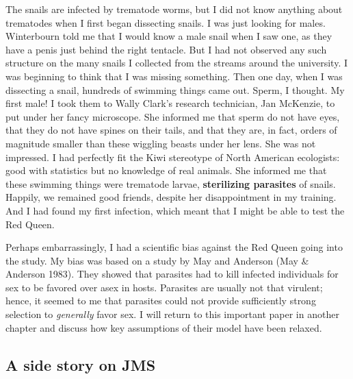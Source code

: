 \documentclass[
  letterpaper,
]{book}
\begin{document}
The snails are infected by trematode worms, but I did not know anything
about trematodes when I first began dissecting snails. I was just
looking for males. Winterbourn told me that I would know a male snail
when I saw one, as they have a penis just behind the right tentacle. But
I had not observed any such structure on the many snails I collected
from the streams around the university. I was beginning to think that I
was missing something. Then one day, when I was dissecting a snail,
hundreds of swimming things came out. Sperm, I thought. My first male! I
took them to Wally Clark's research technician, Jan McKenzie, to put
under her fancy microscope. She informed me that sperm do not have eyes,
that they do not have spines on their tails, and that they are, in fact,
orders of magnitude smaller than these wiggling beasts under her lens.
She was not impressed. I had perfectly fit the Kiwi stereotype of North
American ecologists: good with statistics but no knowledge of real
animals. She informed me that these swimming things were trematode
larvae, \textbf{sterilizing parasites} of snails. Happily, we remained
good friends, despite her disappointment in my training. And I had found
my first infection, which meant that I might be able to test the Red
Queen.

Perhaps embarrassingly, I had a scientific bias against the Red Queen
going into the study. My bias was based on a study by May and Anderson
(May \& Anderson 1983). They showed that parasites had to kill infected
individuals for sex to be favored over asex in hosts. Parasites are
usually not that virulent; hence, it seemed to me that parasites could
not provide sufficiently strong selection to \emph{generally} favor sex.
I will return to this important paper in another chapter and discuss how
key assumptions of their model have been relaxed.

\subsection{A side story on JMS}\label{a-side-story-on-jms}
\end{document}
